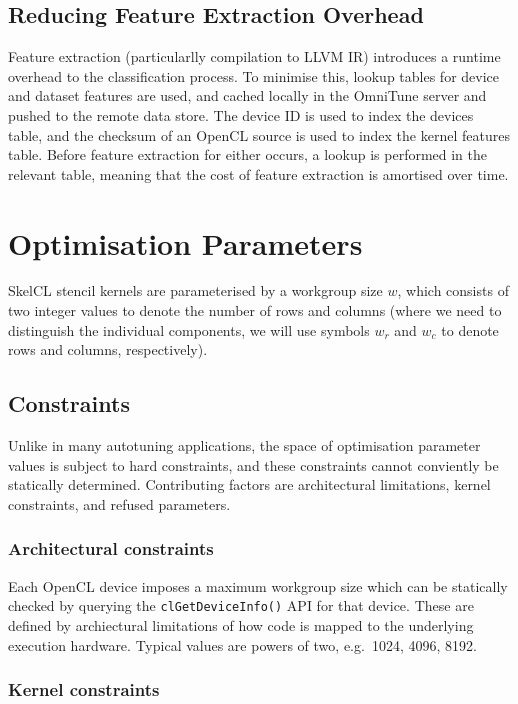 \subsection{Reducing Feature Extraction Overhead}


Feature extraction (particularlly compilation to LLVM IR) introduces a
runtime overhead to the classification process. To minimise this,
lookup tables for device and dataset features are used, and cached
locally in the OmniTune server and pushed to the remote data
store. The device ID is used to index the devices table, and the
checksum of an OpenCL source is used to index the kernel features
table. Before feature extraction for either occurs, a lookup is
performed in the relevant table, meaning that the cost of feature
extraction is amortised over time.


\section{Optimisation Parameters}

SkelCL stencil kernels are parameterised by a workgroup size $w$,
which consists of two integer values to denote the number of rows and
columns (where we need to distinguish the individual components, we
will use symbols $w_r$ and $w_c$ to denote rows and columns,
respectively).


\subsection{Constraints}

Unlike in many autotuning applications, the space of optimisation
parameter values is subject to hard constraints, and these constraints
cannot conviently be statically determined. Contributing factors are
architectural limitations, kernel constraints, and refused parameters.


\subsubsection{Architectural constraints}

Each OpenCL device imposes a maximum workgroup size which can be
statically checked by querying the \texttt{clGetDeviceInfo()} API for
that device. These are defined by archiectural limitations of how code
is mapped to the underlying execution hardware. Typical values are
powers of two, e.g.\ 1024, 4096, 8192.


\subsubsection{Kernel constraints}

